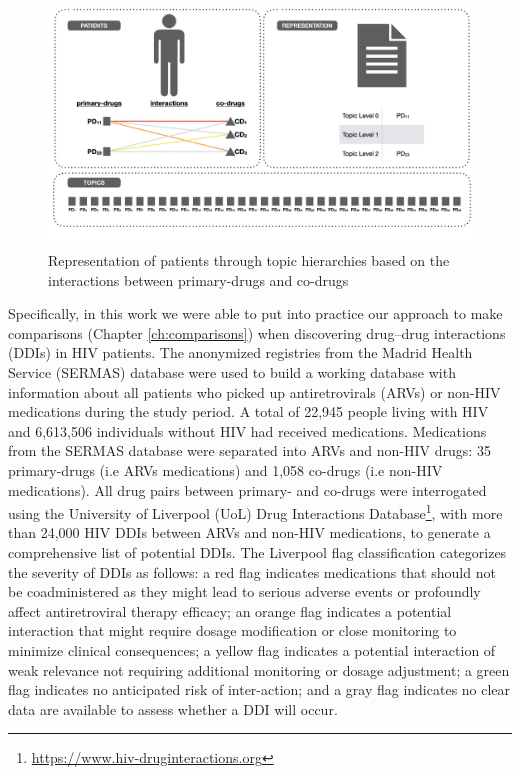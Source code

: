 \begin{figure}[ht]
    \centering
    \includegraphics[width=0.7\linewidth]{polypharmacy.png}
    \caption{Representation of patients through topic hierarchies based on the interactions between primary-drugs and co-drugs}
    \label{fig:polypharmacy-topics}
\end{figure}

Specifically, in this work we were able to put into practice our approach to make comparisons (Chapter \ref{ch:comparisons}) when discovering drug–drug interactions (DDIs) in HIV patients. The anonymized registries from the Madrid Health Service (SERMAS) database were used to build a working database with information about all patients who picked up antiretrovirals (ARVs) or non-HIV medications during the study period. A total of 22,945 people living with HIV and 6,613,506 individuals without HIV had received medications. Medications from the SERMAS database were separated into ARVs and non-HIV drugs: 35 primary-drugs (i.e ARVs medications) and 1,058 co-drugs (i.e non-HIV medications). All drug pairs between primary- and co-drugs were interrogated using the University of Liverpool (UoL) Drug Interactions Database\footnote{\url{https://www.hiv-druginteractions.org}}, with more than 24,000 HIV DDIs between ARVs and non-HIV medications, to generate a comprehensive list of potential DDIs. The Liverpool flag classification  categorizes the severity of DDIs as follows: a red flag indicates medications that should not be coadministered as they might lead to serious adverse events or profoundly affect antiretroviral therapy efficacy; an orange flag indicates a potential interaction that might require dosage modification or close monitoring to minimize clinical consequences; a yellow flag indicates a potential interaction of weak relevance not requiring additional monitoring or dosage adjustment; a green flag indicates no anticipated risk of inter-action; and a gray flag indicates no clear data are available to assess whether a DDI will occur.

